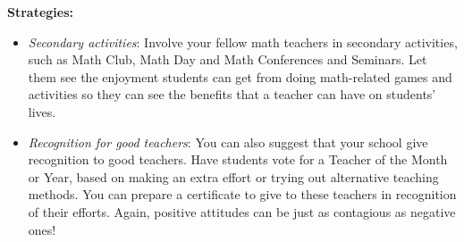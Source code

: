 \textbf{Strategies:}
\begin{itemize}
\item\emph{Secondary activities}: Involve your fellow math teachers in secondary activities, such as Math Club, Math Day and Math Conferences and Seminars. Let them see the enjoyment students can get from doing math-related games and activities so they can see the benefits that a teacher can have on students' lives.

\item\emph{Recognition for good teachers}: You can also suggest that your school give recognition to good teachers. Have students vote for a Teacher of the Month or Year, based on making an extra effort or trying out alternative teaching methods. You can prepare a certificate to give to these teachers in recognition of their efforts. Again, positive attitudes can be just as contagious as negative ones!

\end{itemize}